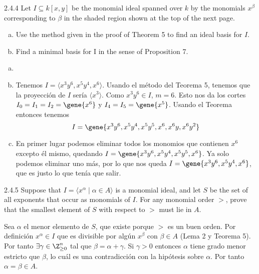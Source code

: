 \documentclass[twoside]{article}
\begin{document}
\newpage

\begin{ejercicio}{2.4.4}
Let $I ⊆ k[x, y]$ be the monomial ideal spanned over $k$ by the monomials $x^{β}$ corresponding
to $β$ in the shaded region shown at the top of the next page.
\begin{enumerate}[a.]
\item Use the method given in the proof of Theorem 5 to find an ideal basis for $I$.
\item Find a minimal basis for I in the sense of Proposition 7.
\end{enumerate}
\end{ejercicio}
\begin{solucion}
\begin{enumerate}[a.]
\item[]
\item Tenemos $I=\langle x^3y^6,x^5y^4, x^6\rangle$. Usando el método del Teorema 5, tenemos que la proyección de $I$ sería $\langle x^3\rangle$. Como $x^3y^6\in I$, $m=6$. Esto nos da los cortes $I_0=I_1=I_2=\gene{x^6}$ y $I_4=I_5=\gene{x^5}$. Usando el Teorema entonces tenemos $$I=\gene{ x^3y^6,x^5y^4,x^5y^5, x^6,x^6y, x^6y^2}$$
\item En primer lugar podemos eliminar todos los monomios que contienen $x^6$ excepto él mismo, quedando $I=\gene{ x^3y^6,x^5y^4,x^5y^5, x^6}$. Ya solo podemos eliminar uno más, por lo que nos queda $I=\gene{ x^3y^6,x^5y^4, x^6}$, que es justo lo que tenía que salir.
\end{enumerate}
\end{solucion}
\newpage

\begin{ejercicio}{2.4.5}
Suppose that $I =\langle 
x^{α} \mid α ∈ A\rangle$ is a monomial ideal, and let $S$ be the set of all exponents
that occur as monomials of $I$. For any monomial order $>$, prove that the smallest element
of $S$ with respect to $>$ must lie in $A$.
\end{ejercicio}
\begin{solucion}
Sea $\alpha$ el menor elemento de $S$, que existe porque $>$ es un buen orden. Por definición $x^\alpha\in I$ que es divisible por algún $x^\beta$ con $\beta \in A$ (Lema 2 y Teorema 5). Por tanto $\exists \gamma \in \Z^n_{\geq 0}$ tal que $\beta  = \alpha + \gamma$. Si $\gamma>0$ entonces $\alpha$ tiene grado menor estricto que $\beta$, lo cuál es una contradicción con la hipótesis sobre $\alpha$. Por tanto $\alpha = \beta \in A$.
\end{solucion}
\end{document}
